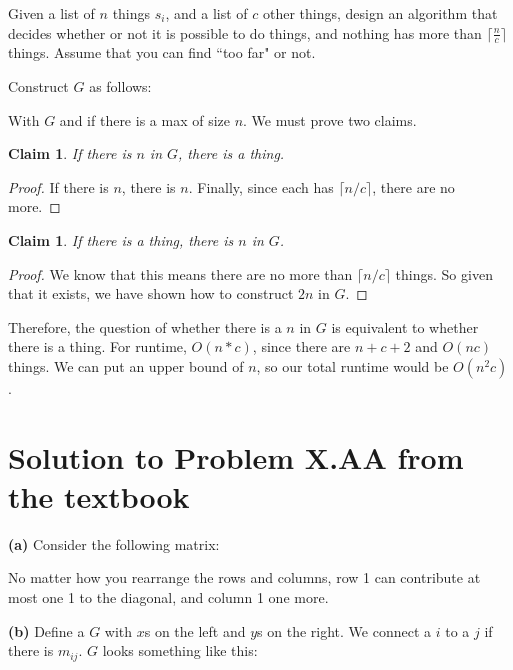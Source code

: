 \documentclass[11pt]{article}
\newtheorem{claim}[theorem]{Claim}
\begin{document}
Given a list of $n$ things $s_i$, and a list of $c$ other things, design an algorithm that decides whether or not it is possible to do things, and nothing has more than $\lceil \frac{n}{c} \rceil$ things. Assume that you can find ``too far" or not.

Construct $G$ as follows:


With $G$ and if there is a max of size $n$. We must prove two claims.
\begin{claim} 
If there is $n$ in $G$, there is a thing. 
\end{claim}
\begin{proof}
If there is $n$, there is $n$. Finally, since each has $\lceil n/c \rceil$, there are no more.
\end{proof}


\begin{claim} 
If there is a thing, there is $n$ in $G$. 
\end{claim}
\begin{proof}
We know that this means there are no more than $\lceil n/c \rceil$ things. So given that it exists, we have shown how to construct $2n$ in $G$.
\end{proof}
Therefore, the question of whether there is a $n$ in $G$ is equivalent to whether there is a thing. For runtime, $O(n*c)$, since there are $n+c+2$ and $O(nc)$ things. We can put an upper bound of $n$, so our total runtime would be $O(n^{2}c)$.


\section*{Solution to Problem X.AA from the textbook}

\textbf{(a)} Consider the following matrix:


No matter how you rearrange the rows and columns, row 1 can contribute at most one 1 to the diagonal, and column 1 one more.

\textbf{(b)}
Define a $G$ with $x$s on the left and $y$s on the right. We connect a $i$ to a $j$ if there is $m_{ij}$. $G$ looks something like this:

\end{document}
